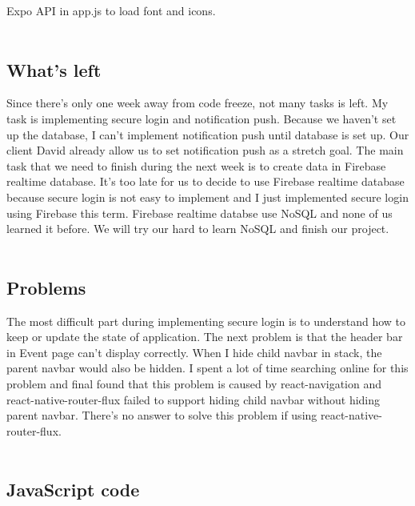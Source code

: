 \documentclass[letterpaper, 10pt,titlepage]{article}
\begin{document}
Expo API in app.js to load font and icons.\\ \\

\subsection{What's left}
Since there's only one week away from code freeze, not many tasks is left. My task is implementing secure login and notification push. Because we haven't set up the database, I can't implement notification push until database is set up. Our client David already allow us to set notification push as a stretch goal. The main task that we need to finish during the next week is to create data in Firebase realtime database. It's too late for us to decide to use Firebase realtime database because secure login is not easy to implement and I just implemented secure login using Firebase this term. Firebase realtime databse  use NoSQL and none of us learned it before. We will try our hard to learn NoSQL and finish our project.\\ \\

\subsection{Problems}
The most difficult part during implementing secure login is to understand how to keep or update the state of application. The next problem is that the header bar in Event page can't display correctly. When I hide child navbar in stack, the parent navbar would also be hidden. I spent a lot of time searching online for this problem and final found that this problem is caused by react-navigation and react-native-router-flux failed to support hiding child navbar without hiding parent navbar. There's no answer to solve this problem if using react-native-router-flux.\\ \\

\subsection{JavaScript code}
\end{document}
